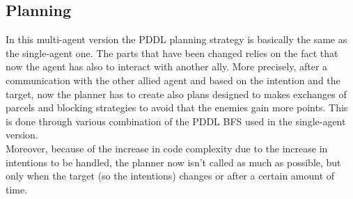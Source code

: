 \documentclass[a4paper, 11pt]{article}
\begin{document}
 
\subsection{Planning}

In this multi-agent version the PDDL planning strategy is basically the same as the single-agent one. The parts that have been changed relies on the fact that now the agent has also to interact with another ally. More precisely, after a communication with the other allied agent and based on the intention and the target, now the planner has to create also plans designed to makes exchanges of parcels and blocking strategies to avoid that the enemies gain more points. This is done through various combination of the PDDL BFS used in the single-agent version.\\
Moreover, because of the increase in code complexity due to the increase in intentions to be handled, the planner now isn't called as much as possible, but only when the target (so the intentions) changes or after a certain amount of time.

\pagebreak

%
\end{document}
